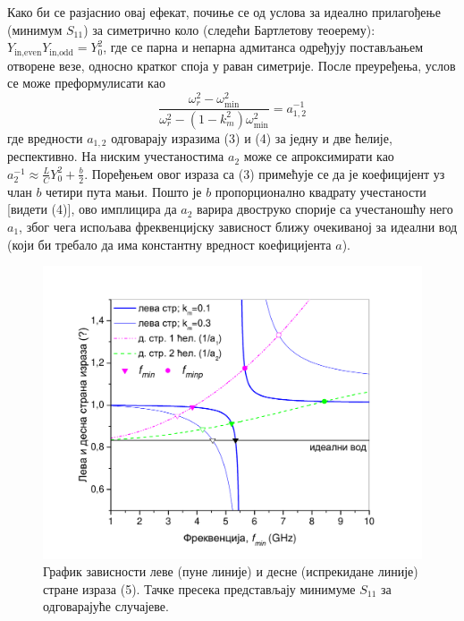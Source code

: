 Како би се разјаснио овај ефекат, почиње се од услова за идеално прилагођење (минимум $S_{11}$) за симетрично коло (следећи Бартлетову теоерему): $Y_\text{in,even} Y_\text{in,odd}=Y_0^2$, где се парна и непарна адмитанса одређују постављањем отворене везе, односно кратког споја у раван симетрије. После преуређења, услов се може преформулисати као
\begin{equation}
\frac{\omega_r^2 - \omega_\text{min}^2}{\omega_r^2-(1-k_m^2)\omega_\text{min}^2} =
a_{1,2}^{-1}
\end{equation}
где вредности $a_{1,2}$ одговарају изразима (3) и (4) за једну и две ћелије, респективно. На ниским учестаностима $a_2$ може се апроксимирати као $a_2^{-1} \approx
\frac{L}{C} Y_0^2 + \frac{b}{2}$. Поређењем овог израза са (3) примећује се да је коефицијент уз члан $b$ четири пута мањи. Пошто је $b$ пропорционално квадрату учестаности [видети (4)], ово имплицира да $a_2$ варира двоструко спорије са учестаношћу него $a_1$, због чега испољава фреквенцијску зависност ближу очекиваној за идеални вод (који би требало да има константну вредност коефицијента $a$). 
\begin{figure}[!t]
\centering
\includegraphics[width=\textwidth]{sl_ekv/fig5}
\caption{График зависности леве (пуне линије) и десне (испрекидане линије) стране израза (5). Тачке пресека представљају минимуме $S_{11}$ за одговарајуће случајеве.}
\label{f5}
\end{figure}

